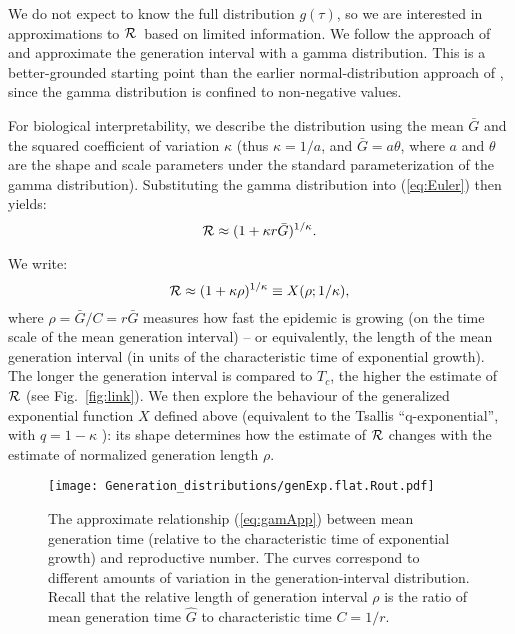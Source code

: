 \documentclass[12pt]{article}
\newcommand{\RR}{\ensuremath{{\cal R}}}
\newcommand{\Tc}{\ensuremath{C}}
\newcommand{\eref}[1]{(\ref{eq:#1})}
\newcommand{\fref}[1]{Fig.~\ref{fig:#1}}
\begin{document}
We do not expect to know the full distribution $g(\tau)$, so we are interested in approximations to \RR\ based on limited information.
We follow the approach of \cite{NishCast09} and approximate the generation interval with a gamma distribution.
This is a better-grounded starting point than the earlier normal-distribution approach of \cite{WallLips07}, since the gamma distribution is confined to non-negative values. 

For biological interpretability, we describe the distribution using the mean $\bar G$ and the squared coefficient of variation $\kappa$ (thus $\kappa = 1/a$, and $\bar G = a\theta$, where $a$ and $\theta$ are the shape and scale parameters under the standard parameterization of the gamma distribution).
Substituting the gamma distribution into \eref{Euler} then yields:
\begin{equation}
	\RR \approx (1 + \kappa r \bar G)^{1/\kappa}.
	\label{eq:gamApp}
\end{equation}

We write:
\begin{equation}
	\RR \approx (1 + \kappa \rho)^{1/\kappa} \equiv X(\rho; 1/\kappa),
	\label{eq:genExp}
\end{equation}
where $\rho = \bar G/\Tc = r\bar G$ measures how fast the epidemic is growing (on the time scale of the mean generation interval) -- or equivalently, the length of the mean generation interval (in units of the characteristic time of exponential growth).
The longer the generation interval is compared to $T_c$, the higher the estimate of $\RR$ (see \fref{link}).
We then explore the behaviour of the generalized exponential function $X$ defined above (equivalent to the Tsallis ``q-exponential'', with $q=1-\kappa$ \cite{tsallis1994numbers}): its shape determines how the estimate of $\RR$ changes with the estimate of normalized generation length $\rho$.

\begin{figure}[htbp]
	\centering \texttt{[image: Generation\_distributions/genExp.flat.Rout.pdf]}
	\caption{
		The approximate relationship \eref{gamApp} between mean
		generation time (relative to the characteristic time of
		exponential growth) and reproductive number. The curves correspond to different
		amounts of variation in the generation-interval
		distribution. 
		Recall that the 
		relative length of generation interval $\rho$ is the ratio of
		mean generation time $\hat G$ to characteristic time $C = 1/r$.
	} \label{fig:genExp} 
\end{figure}
\end{document}
